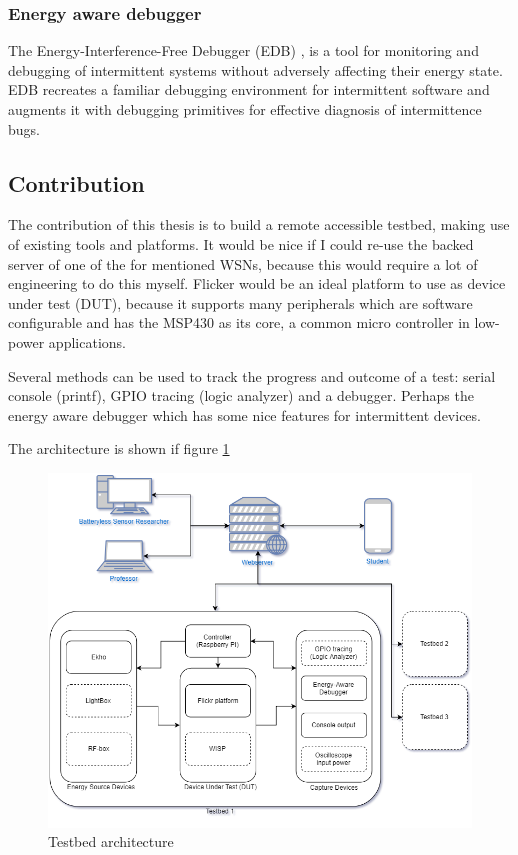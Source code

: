 \documentclass[]{article}
\begin{document}
\subsubsection{Energy aware debugger}
The Energy-Interference-Free Debugger (EDB) \cite{edb}, is a tool for monitoring and debugging of intermittent systems without adversely affecting their energy state. EDB recreates a familiar debugging environment for intermittent software and augments it with debugging primitives for effective diagnosis of intermittence bugs.

\subsection{Contribution}
The contribution of this thesis is to build a remote accessible testbed, making use of existing tools and platforms. It would be nice if I could re-use the backed server of one of the for mentioned WSNs, because this would require a lot of engineering to do this myself. Flicker would be an ideal platform to use as device under test (DUT), because it supports many peripherals which are software configurable and has the MSP430 as its core, a common micro controller in low-power applications.

Several methods can be used to track the progress and outcome of a test: serial console (printf), GPIO tracing (logic analyzer) and a debugger. Perhaps the energy aware debugger which has some nice features for intermittent devices.

The architecture is shown if figure \ref{fig:architecture}

\begin{figure}[H]
	\centering
	\includegraphics[width=\linewidth]{TestbedArchitecture_v2}
	\caption{Testbed architecture}
	\label{fig:architecture}
\end{figure}




\end{document}
